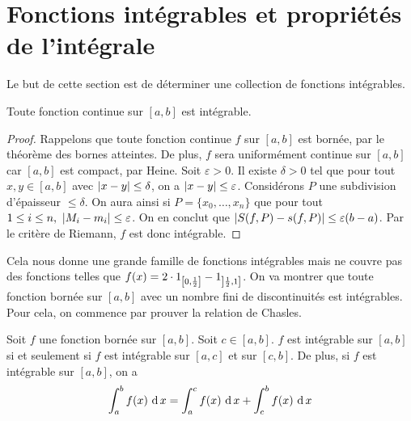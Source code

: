 \section{Fonctions intégrables et propriétés de l'intégrale}
Le but de cette section est de déterminer une collection de fonctions intégrables.
\begin{proposition}
    Toute fonction continue sur $[a,b]$ est intégrable.
\end{proposition}
\begin{proof}
    Rappelons que toute fonction continue $f$ sur $[a,b]$ est bornée, par le théorème des bornes atteintes. De plus, $f$ sera uniformément continue sur $[a,b]$ car $[a,b]$ est compact, par Heine. Soit $\varepsilon>0$. Il existe $\delta>0$ tel que pour tout $x,y\in[a,b]$ avec $\left| x-y \right|\le\delta$, on a $\left| x-y \right|\le \varepsilon$. Considérons $P$ une subdivision d'épaisseur $\le\delta$. On aura ainsi si $P = \{x_0,\ldots, x_n\}$ que pour tout $1\le i \le n,\ \left| M_i-m_i \right|\le \varepsilon$. On en conclut que $\left| S(f,P)-s(f,P) \right|\le \varepsilon(b-a)$.
    Par le critère de Riemann, $f$ est donc intégrable.
\end{proof}
Cela nous donne une grande famille de fonctions intégrables mais ne couvre pas des fonctions telles que $f(x) = 2 \cdot1_{\left[ 0,\frac12\right]} - 1_{\left] \frac12,1\right]}$.
On va montrer que toute fonction bornée sur $[a,b]$ avec un nombre fini de discontinuités est intégrables.
Pour cela, on commence par prouver la relation de Chasles.
\begin{proposition}
    Soit $f$ une fonction bornée sur $[a,b]$. Soit $c\in[a,b]$. $f$ est intégrable sur $[a,b]$ si et seulement si $f$ est intégrable sur $[a,c]$ et sur $[c,b]$. De plus, si $f$ est intégrable sur $[a,b]$, on a $$\int_a^bf(x)\,\operatorname{d} x = \int_a^cf(x)\,\operatorname{d} x + \int_c^bf(x)\,\operatorname{d} x$$
\end{proposition}
